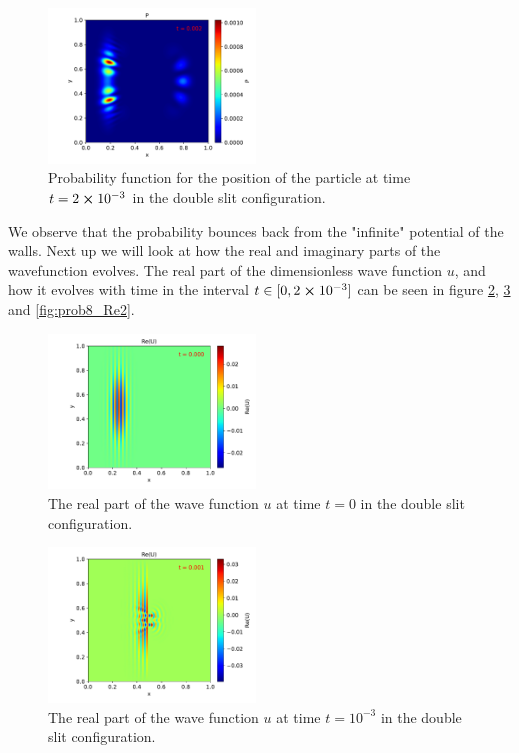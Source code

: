 \documentclass[english,notitlepage,reprint,nofootinbib]{revtex4-2}  %
\begin{document}
	\begin{figure}[H]
		\centering
		\includegraphics[width=0.49\textwidth]{figures/problem8_P_0.002.pdf}
		\caption{Probability function for the position of the particle at time $t=2\cross10^{-3}$ in the double slit configuration.}
		\label{fig:prob8_P2}
	\end{figure}
	\noindent
	We observe that the probability bounces back from the "infinite" potential of the walls. Next up we will look at how the real and imaginary parts of the wavefunction evolves. The real part of the dimensionless wave function $u$, and how it evolves with time in the interval $t \in[0, 2\cross10^{-3}]$ can be seen in figure \ref{fig:prob8_Re0}, \ref{fig:prob8_Re1} and \ref{fig:prob8_Re2}.

	\begin{figure}[H]
		\centering
		\includegraphics[width=0.49\textwidth]{figures/problem8_U_Re_0.000.pdf}
		\caption{The real part of the wave function $u$ at time $t = 0$ in the double slit configuration.}
		\label{fig:prob8_Re0}
	\end{figure}

	\begin{figure}[h!]
		\centering
		\includegraphics[width=0.49\textwidth]{figures/problem8_U_Re_0.001.pdf}
		\caption{The real part of the wave function $u$ at time $t = 10^{-3}$ in the double slit configuration.}
		\label{fig:prob8_Re1}
	\end{figure}
\end{document}
